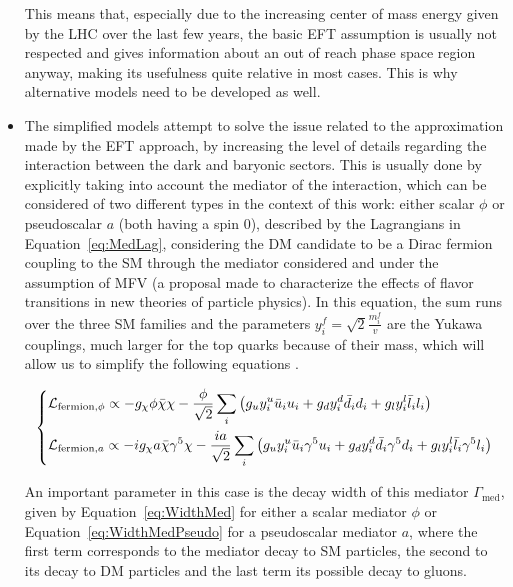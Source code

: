 \documentclass[a4paper, 10pt, openright]{report}
\begin{document}
\begin{itemize}
This means that, especially due to the increasing center of mass energy given by the \ac{LHC} over the last few years, the basic \ac{EFT} assumption is usually not respected and gives information about an out of reach phase space region anyway, making its usefulness quite relative in most cases. This is why alternative models need to be developed as well.

\item The simplified models attempt to solve the issue related to the approximation made by the \ac{EFT} approach, by increasing the level of details regarding the interaction between the dark and baryonic sectors. This is usually done by explicitly taking into account the mediator of the interaction, which can be considered of two different types in the context of this work: either scalar $\phi$ or pseudoscalar $a$ (both having a spin 0), described by the Lagrangians in Equation~\ref{eq:MedLag}, considering the \ac{DM} candidate to be a Dirac fermion coupling to the \ac{SM} through the mediator considered and under the assumption of \acf{MFV} (a proposal made to characterize the effects of flavor transitions in new theories of particle physics). In this equation, the sum runs over the three \ac{SM} families and the parameters $y_i^f = \sqrt{2} \frac{m_i^f}{v}$ are the Yukawa couplings, much larger for the top quarks because of their mass, which will allow us to simplify the following equations \cite{SimplifiedModels}.

\begin{equation}
\label{eq:MedLag}
\begin{dcases}
\mathcal{L}_{\text{fermion}, \phi} \propto - g_\chi \phi \bar \chi \chi - \frac{\phi}{\sqrt{2}} \sum_i \left (g_u y_i^u \bar u_i u_i + g_d y_i^d \bar d_i d_i + g_l y_i^l \bar l_i l_i \right ) \\
\mathcal{L}_{\text{fermion}, a} \propto - i g_\chi a \bar \chi \gamma^5 \chi - \frac{i a}{\sqrt{2}} \sum_i \left (g_u y_i^u \bar u_i \gamma^5 u_i + g_d y_i^d \bar d_i \gamma^5 d_i + g_l y_i^l \bar l_i \gamma^5 l_i \right )
\end{dcases}
\end{equation}

An important parameter in this case is the decay width of this mediator $\Gamma_{\text{med}}$, given by Equation~\ref{eq:WidthMed} for either a scalar mediator $\phi$ or Equation~\ref{eq:WidthMedPseudo} for a pseudoscalar mediator $a$, where the first term corresponds to the mediator decay to \ac{SM} particles, the second to its decay to \ac{DM} particles and the last term its possible decay to gluons. 


\end{itemize}
\end{document}
